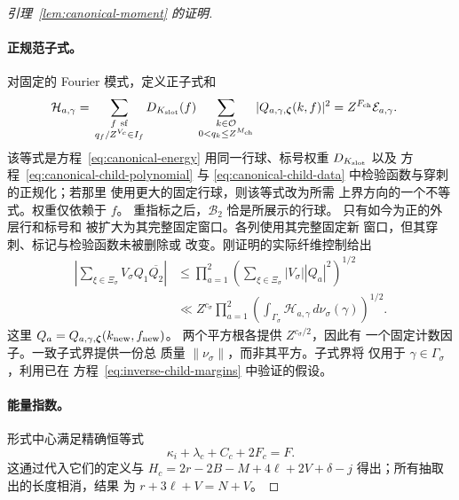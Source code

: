 \documentclass[11pt,a4paper]{article}
\numberwithin{equation}{section}
\numberwithin{figure}{section}
\theoremstyle{definition}
\theoremstyle{remark}
\begin{document}
\begin{proof}[引理~\ref{lem:canonical-moment} 的证明]
\paragraph{正规范子式。}
对固定的 Fourier 模式，定义正子式和
\begin{equation}\label{eq:inverse-positive-child}
 \begin{split}
 \mathcal H_{a,\gamma}={}&
 \sum_{\substack{f\ {\rm sf}\\q_f/Z^{V_c}\in I_f}}
 D_{K_{\rm slot}}(f)
 \sum_{\substack{k\in\mathcal O\\0<q_k\le Z^{M_{\rm ch}}}}
 |Q_{a,\gamma,\boldsymbol\zeta}(k,f)|^2
 =Z^{F_{\rm ch}}\mathcal E_{a,\gamma}.
 \end{split}
\end{equation}
该等式是方程~\eqref{eq:canonical-energy} 用同一行球、标号权重
\(D_{K_{\rm slot}}\) 以及
方程~\eqref{eq:canonical-child-polynomial}
与 \eqref{eq:canonical-child-data} 中检验函数与穿刺的正规化；若那里
使用更大的固定行球，则该等式改为所需
上界方向的一个不等式。权重仅依赖于 \(f\)。
重指标之后，\(\mathcal B_2\) 恰是所展示的行球。
只有如今为正的外层行和标号和
被扩大为其完整固定窗口。各列使用其完整固定新
窗口，但其穿刺、标记与检验函数未被删除或
改变。刚证明的实际纤维控制给出
\[
 \begin{split}
 \left|\sum_{\xi\in\Xi_\sigma}V_\sigma Q_1\overline{Q_2}\right|
 &\le\prod_{a=1}^2
       \left(\sum_{\xi\in\Xi_\sigma}|V_\sigma||Q_a|^2\right)^{1/2}\\
 &\ll Z^{c_\sigma}\prod_{a=1}^2
       \left(\int_{\Gamma_\sigma}\mathcal H_{a,\gamma}
                    \,d\nu_\sigma(\gamma)\right)^{1/2}.
 \end{split}
\]
这里 \(Q_a=Q_{a,\gamma,\boldsymbol\zeta}(k_{\rm new},f_{\rm new})\)。
两个平方根各提供 \(Z^{c_\sigma/2}\)，因此有
一个固定计数因子。一致子式界提供一份总
质量 \(\|\nu_\sigma\|\)，而非其平方。子式界将
仅用于 \(\gamma\in\Gamma_\sigma\)，利用已在
方程~\eqref{eq:inverse-child-margins} 中验证的假设。

\paragraph{能量指数。}
形式中心满足精确恒等式
\begin{equation}\label{eq:canonical-prefactor}
 \kappa_i+\lambda_c+C_c+2F_c=F.
\end{equation}
这通过代入它们的定义与
\(H_c=2r-2B-M+4\ell+2V+\delta-j\) 得出；所有抽取出的长度相消，结果
为 \(r+3\ell+V=N+V\)。


\end{proof}
\end{document}

